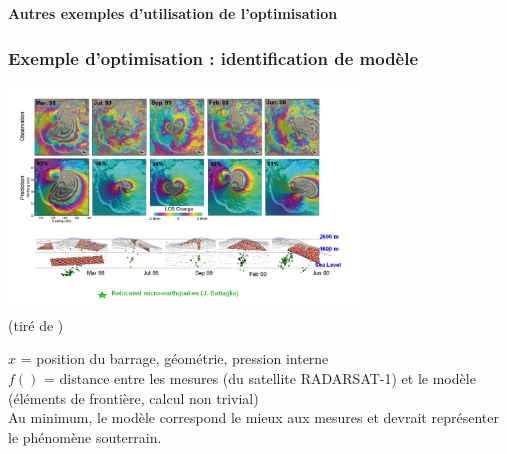 \documentclass[12pt]{beamer}
\begin{document}
\begin{frame}
\begin{center}
{ 
\textbf{
Autres exemples d'utilisation de l'optimisation
} %
}%
\end{center}
\end{frame}


\begin{frame}
\frametitle{Exemple d'optimisation : identification de modèle}
\begin{center}
\includegraphics[width=0.7\textwidth]{piton_fournaise.jpg}\\
\vspace{-1cm}
{\hfill\tiny (tiré de \cite{fukushima2010evolution})}
\end{center}
$x$ = position du barrage, géométrie, pression interne\\
$f()$ = distance entre les mesures (du satellite RADARSAT-1) et le modèle (éléments de frontière, calcul non trivial)\\
Au minimum, le modèle correspond le mieux aux mesures et devrait représenter le phénomène souterrain.
\end{frame}
\end{document}
